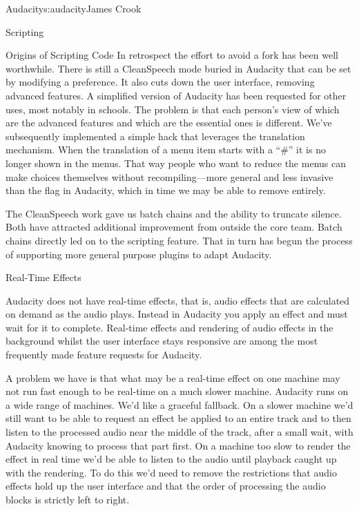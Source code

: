 \begin{aosachapter}{Audacity}{s:audacity}{James Crook}
\begin{aosasect1}{Scripting}
\begin{aosabox}{Origins of Scripting Code}
In retrospect the effort to avoid a fork has been well worthwhile.
There is still a CleanSpeech mode buried in Audacity that can be
set by modifying a preference. It also cuts down the user interface,
removing advanced features. A simplified version of Audacity has been
requested for other uses, most notably in schools. The problem is that
each person's view of which are the advanced features and which are
the essential ones is different.  We've subsequently implemented a
simple hack that leverages the translation mechanism.  When the
translation of a menu item starts with a ``\#'' it is no longer shown
in the menus.  That way people who want to reduce the menus can make
choices themselves without recompiling---more general and less
invasive than the  flag in Audacity, which in time we
may be able to remove entirely.

The CleanSpeech work gave us batch chains and the ability to
truncate silence.  Both
have attracted additional improvement from outside the core team.
Batch chains directly led on to the scripting feature.  That in turn
has begun the process of supporting more general purpose plugins to
adapt Audacity.

\end{aosabox}

\end{aosasect1}

\begin{aosasect1}{Real-Time Effects}

Audacity does not have real-time effects, that is, audio effects that
are calculated on demand as the audio plays.  Instead in Audacity you
apply an effect and must wait for it to complete.  Real-time effects
and rendering of audio effects in the background whilst the user
interface stays responsive are among the most frequently made
feature requests for Audacity.

A problem we have is that what may be a real-time effect on one
machine may not run fast enough to be real-time on a much slower
machine.  Audacity runs on a wide range of machines.  We'd like a
graceful fallback.  On a slower machine we'd still want to be able to
request an effect be applied to an entire track and to then listen to
the processed audio near the middle of the track, after a small wait,
with Audacity knowing to process that part first.  On a machine too
slow to render the effect in real time we'd be able to listen to the
audio until playback caught up with the rendering.  To do this we'd
need to remove the restrictions that audio effects hold up the user
interface and that the order of processing the audio blocks is
strictly left to right.


\end{aosasect1}
\end{aosachapter}
